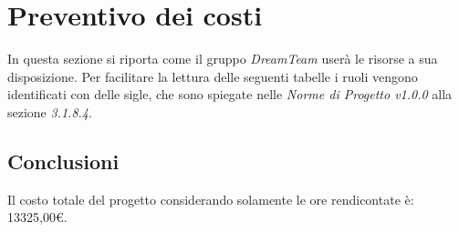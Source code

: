 \section{Preventivo dei costi}
In questa sezione si riporta come il gruppo \textit{DreamTeam} userà le risorse a sua disposizione.  Per facilitare la lettura delle seguenti tabelle i ruoli vengono identificati con delle sigle,  che sono spiegate nelle \textit{Norme di Progetto v1.0.0} alla sezione \textit{3.1.8.4}.


\pagebreak

\pagebreak

\pagebreak

\pagebreak


\subsection{Conclusioni}
Il costo totale del progetto considerando solamente le ore rendicontate è:  13325,00\euro .

\pagebreak